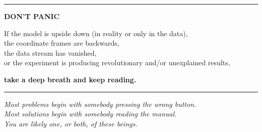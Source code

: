 \documentclass[12pt,a4paper]{article}
\begin{document}
\begin{titlepage}
\begin{minipage}{0.35\textwidth}
	\end{minipage}
	\hfill
	\rule{0.25\textwidth}{0.8pt}
		\vfill

		

		

		
	\end{titlepage}
	\clearpage
	\thispagestyle{empty}
	
	\vspace*{\fill}
	
	\begin{center}
		{\fontsize{50}{60}\selectfont\bfseries DON'T PANIC}
		
		\vspace{1cm}
		
	{\Large
		If the model is upside down (in reality or only in the data),\\
		the coordinate frames are backwards,\\
		the data stream has vanished,\\
		or the experiment is producing revolutionary and/or unexplained results,
	}
		
		\vspace{1cm}
		
		{\LARGE\bfseries
			take a deep breath and keep reading.
		}
		
		\vspace{2cm}
		
		\rule{0.6\textwidth}{0.5pt}
		
		\vspace{0.5cm}
		
\begin{minipage}{0.75\textwidth}
	\centering
	\itshape
	Most problems begin with somebody pressing the wrong button.\\
	Most solutions begin with somebody reading the manual.\\[0.5em]
	You are likely one, or both, of these beings.
\end{minipage}	
		
	\end{center}
	
\end{document}
